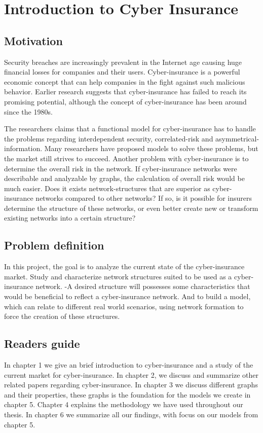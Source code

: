 \chapter{Introduction to Cyber Insurance}
\label{chp:introductionToCyberInsurance} 

\section{Motivation}
Security breaches are increasingly prevalent in the Internet age causing huge financial losses for companies and their users. Cyber-insurance is a powerful economic concept that can help companies in the fight against such malicious behavior. Earlier research suggests that cyber-insurance has failed to reach its promising potential, although the concept of cyber-insurance has been around since the 1980s. 

The researchers claims that a functional model for cyber-insurance has to handle the problems regarding interdependent security, correlated-risk and asymmetrical-information. Many researchers have proposed models to solve these problems, but the market still strives to succeed. Another problem with cyber-insurance is to determine the overall risk in the network. If cyber-insurance networks were describable and analyzable by graphs, the calculation of overall risk would be much easier. Does it exists network-structures that are superior as cyber-insurance networks compared to other networks? If so, is it possible for insurers determine the structure of these networks, or even better create new or transform existing networks into a certain structure?

\section{Problem definition}
In this project, the goal is to analyze the current state of the cyber-insurance market. Study and characterize network structures suited to be used as a cyber-insurance network. -A desired structure will possesses some characteristics that would be beneficial to reflect a cyber-insurance network. And to build a model, which can relate to different real world scenarios, using network formation to force the creation of these structures. 
\section{Readers guide}
In chapter 1 we give an brief introduction to cyber-insurance and a study of the current market for cyber-insurance. In chapter 2, we discuss and summarize other related papers regarding cyber-insurance. In chapter 3 we discuss different graphs and their properties, these graphs is the foundation for the models we create in chapter 5. Chapter 4 explains the methodology we have used throughout our thesis. In chapter 6 we summarize all our findings, with focus on our models from chapter 5. 

